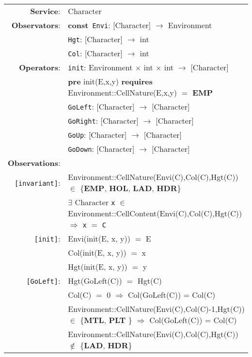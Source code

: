 \documentclass[8pt]{article}
\begin{document}
{\small
\begin{longtable}{rl}
  \textbf{Service}: & \textrm{Character}  \\
  \textbf{Observators}: & \textbf{const}~\texttt{Envi}: \textrm{[Character]} $\rightarrow$ \textrm{Environment}  \\
  & \texttt{Hgt}: \textrm{[Character]} $\rightarrow$ \textrm{int}  \\
  & \texttt{Col}: \textrm{[Character]} $\rightarrow$ \textrm{int}  \\
  \textbf{Operators}: & \texttt{init}: \textrm{Environment} $\times$ \textrm{int} $\times$ \textrm{int} $\rightarrow$ \textrm{[Character]} \\
  & \quad\textbf{pre} \textrm{init(E,x,y)} \textbf{requires} \textrm{Environment::CellNature(E,x,y)} $=$ \textbf{EMP} \\
  & \texttt{GoLeft}: \textrm{[Character]} $\rightarrow$ \textrm{[Character]} \\
  & \texttt{GoRight}: \textrm{[Character]} $\rightarrow$ \textrm{[Character]} \\
  & \texttt{GoUp}: \textrm{[Character]} $\rightarrow$ \textrm{[Character]} \\
  & \texttt{GoDown}: \textrm{[Character]} $\rightarrow$ \textrm{[Character]} \\
  \textbf{Observations}: \\
  \texttt{[invariant]}: & \textrm{Environment::CellNature(Envi(C),Col(C),Hgt(C))} $\in$ \{\textbf{EMP}, \textbf{HOL}, \textbf{LAD}, \textbf{HDR}\} \\
  & $\exists$ \textrm{Character} \texttt{x} $\in$ \textrm{Environment::CellContent(Envi(C),Col(C),Hgt(C))} $\Rightarrow$ \texttt{x} $=$ \texttt{C}  \\
  \texttt{[init]}: & \textrm{Envi(init(E, x, y))} $=$ \textrm{E} \\
  & \textrm{Col(init(E, x, y))} $=$ \textrm{x} \\
  & \textrm{Hgt(init(E, x, y))} $=$ \textrm{y} \\
  \texttt{[GoLeft]}: & \textrm{Hgt(GoLeft(C))} $=$ \textrm{Hgt(C)} \\
  & \textrm{Col(C)} $=$ 0 $\Rightarrow$ \textrm{Col(GoLeft(C))} = \textrm{Col(C)} \\
  & \textrm{Environment::CellNature(Envi(C),Col(C)-1,Hgt(C))} $\in$ \{\textbf{MTL}, \textbf{PLT} \} $\Rightarrow$ \textrm{Col(GoLeft(C))} = \textrm{Col(C)} \\
  & \textrm{Environment::CellNature(Envi(C),Col(C),Hgt(C))} $\notin$ \{\textbf{LAD}, \textbf{HDR}\}

\end{longtable}}
\end{document}
